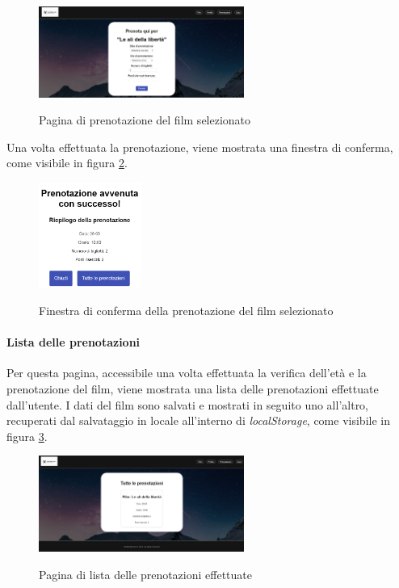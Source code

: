 \begin{figure}[h]
    \centering
    \includegraphics[width=0.6\textwidth, alt={Schermata della pagina di prenotazione del film selezionato}]{immagini/frontend/movie-booking.png}
    \caption{Pagina di prenotazione del film selezionato}\label{fig:prenotazione-film}
\end{figure}

\newpage

Una volta effettuata la prenotazione, viene mostrata una finestra di conferma, come visibile in figura \ref{fig:conferma-prenotazione}.
\begin{figure}[h]
    \centering
    \includegraphics[width=0.3\textwidth, alt={Schermata della pagina di conferma della prenotazione del film selezionato}]{immagini/frontend/movie-booking-done.png}
    \caption{Finestra di conferma della prenotazione del film selezionato}\label{fig:conferma-prenotazione}
\end{figure}

\paragraph{Lista delle prenotazioni}
Per questa pagina, accessibile una volta effettuata la verifica dell'età e la prenotazione del film, viene mostrata una lista delle prenotazioni effettuate dall'utente.
I dati del film sono salvati e mostrati in seguito uno all'altro, recuperati dal salvataggio in locale all'interno di \textit{localStorage}, come visibile in figura \ref{fig:lista-prenotazioni}.

\begin{figure}[h]
    \centering
    \includegraphics[width=0.6\textwidth, alt={Schermata della pagina di lista delle prenotazioni effettuate}]{immagini/frontend/movie-booking-list.png}
    \caption{Pagina di lista delle prenotazioni effettuate}\label{fig:lista-prenotazioni}
\end{figure}


